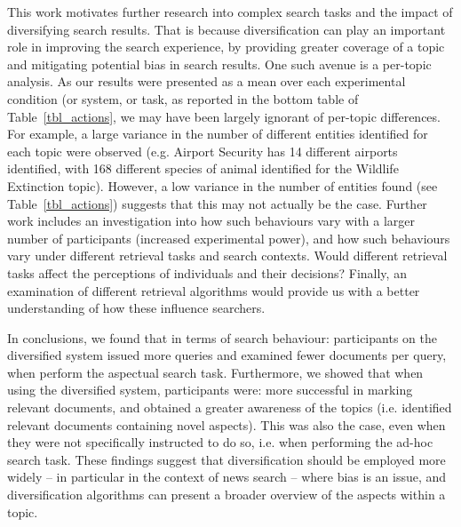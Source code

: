 This work motivates further research into complex search tasks and the impact of diversifying search results. That is because diversification can play an important role in improving the search experience, by providing greater coverage of a topic and mitigating potential bias in search results. One such avenue is a per-topic analysis. As our results were presented as a mean over each experimental condition (or system, or task, as reported in the bottom table of Table~\ref{tbl_actions}, we may have been largely ignorant of per-topic differences. For example, a large variance in the number of different entities identified for each topic were observed (e.g. Airport Security has 14 different airports identified, with 168 different species of animal identified for the Wildlife Extinction topic). However, a low variance in the number of entities found (see Table~\ref{tbl_actions}) suggests that this may not actually be the case. Further work includes an investigation into how such behaviours vary with a larger number of participants (increased experimental power), and how such behaviours vary under different retrieval tasks and search contexts. Would different retrieval tasks affect the perceptions of individuals and their decisions? Finally, an examination of different retrieval algorithms would provide us with a better understanding of how these influence searchers.


In conclusions, we found that in terms of search behaviour: participants on the diversified system issued more queries and examined fewer documents per query, when perform the aspectual search task. Furthermore, we showed that when using the diversified system, participants were: more successful in marking relevant documents, and obtained a greater awareness of the topics (i.e. identified relevant documents containing novel aspects). This was also the case, even when they were not specifically instructed to do so, i.e. when performing the ad-hoc search task.
These findings suggest that diversification should be employed more widely -- in particular in the context of news search -- where bias is an issue, and diversification algorithms can present a broader overview of the aspects within a topic.   





